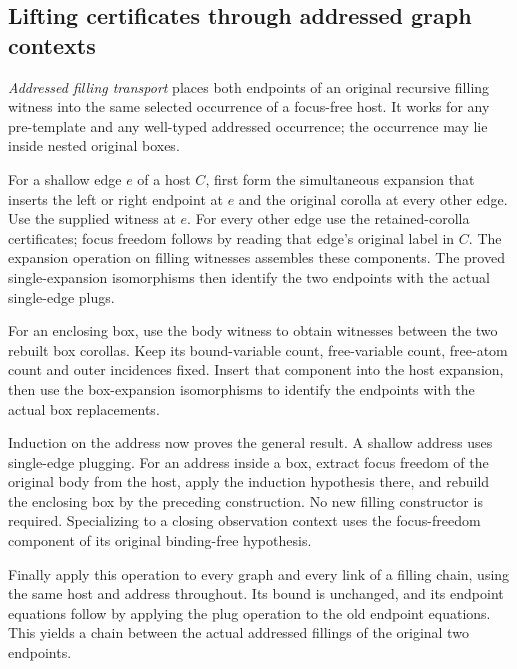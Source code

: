 \subsection{Lifting certificates through addressed graph contexts}
\emph{Addressed filling transport} places both endpoints of an original
recursive filling witness into the same selected occurrence of a focus-free
host. It works for any pre-template and any well-typed addressed occurrence;
the occurrence may lie inside nested original boxes.

For a shallow edge $e$ of a host $C$, first form the simultaneous expansion
that inserts the left or right endpoint at $e$ and the original corolla at
every other edge. Use the supplied witness at $e$. For every other edge use
the retained-corolla certificates; focus freedom follows by reading that
edge's original label in $C$. The expansion operation on filling witnesses
assembles these components. The proved single-expansion isomorphisms then
identify the two endpoints with the actual single-edge plugs.


For an enclosing box, use the body witness to obtain witnesses between the
two rebuilt box corollas. Keep its bound-variable count, free-variable count,
free-atom count and outer incidences fixed. Insert that component into the
host expansion, then use the box-expansion isomorphisms to identify the
endpoints with the actual box replacements.


Induction on the address now proves the general result. A shallow address
uses single-edge plugging. For an address inside a box, extract focus freedom
of the original body from the host, apply the induction hypothesis there,
and rebuild the enclosing box by the preceding construction. No new filling
constructor is required. Specializing to a closing observation context uses
the focus-freedom component of its original binding-free hypothesis.


Finally apply this operation to every graph and every link of a filling chain,
using the same host and address throughout. Its bound is unchanged, and
its endpoint equations follow by applying the plug operation to the old
endpoint equations. This yields a chain between the actual addressed fillings
of the original two endpoints.

